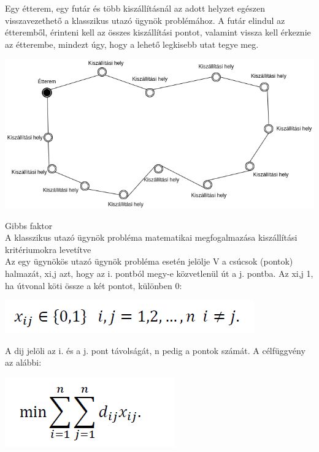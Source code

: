 


Egy étterem, egy futár és több kiszállításnál az adott helyzet egészen visszavezethető a klasszikus utazó ügynök problémához.
A futár elindul az étteremből, érinteni kell az összes kiszállítási pontot, valamint vissza kell érkeznie az étterembe, mindezt úgy, hogy a lehető legkisebb utat tegye meg.

\includegraphics[scale=0.5]{images/Simpletsp.png}


Gibbs faktor \\

A klasszikus utazó ügynök probléma matematikai megfogalmazása kiszállítási kritériumokra levetítve\\

Az egy ügynökös utazó ügynök probléma esetén jelölje V a csúcsok (pontok) halmazát, xi,j azt, hogy az i. pontból megy-e közvetlenül út a j. pontba. Az xi,j 1, ha útvonal köti össze a két pontot, különben 0:

\includegraphics[scale=0.5]{images/1tsp.png}

A dij jelöli az i. és a j. pont távolságát, n pedig a pontok számát. A célfüggvény az alábbi:

\includegraphics[scale=0.5]{images/2tsp.png}


